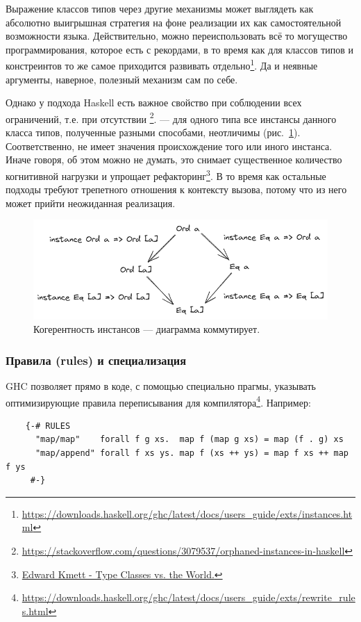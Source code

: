 Выражение классов типов через другие механизмы может выглядеть как абсолютно выигрышная стратегия на фоне реализации их как самостоятельной возможности языка.
Действительно, можно переиспользовать всё то могущество программирования, которое есть с рекордами, в то время как для классов типов и констреинтов то же самое приходится развивать отдельно\footnote{\url{https://downloads.haskell.org/ghc/latest/docs/users_guide/exts/instances.html}}.
Да и неявные аргументы, наверное, полезный механизм сам по себе.

Однако у подхода Haskell есть важное свойство при соблюдении всех ограничений, т.е. при отсутствии \footnote{\url{https://stackoverflow.com/questions/3079537/orphaned-instances-in-haskell}}.
 --- для одного типа все инстансы данного класса типов, полученные разными способами, неотличимы (рис.~\ref{fig:coherence}).
Соответственно, не имеет значения происхождение того или иного инстанса.
Иначе говоря, об этом можно не думать, это снимает существенное количество когнитивной нагрузки и упрощает рефакторинг\footnote{\href{https://youtu.be/hIZxTQP1ifo?si=aG2Lk2eb-5E5SOLb}{Edward Kmett - Type Classes vs. the World.}}.
В то время как остальные подходы требуют трепетного отношения к контексту вызова, потому что из него может прийти неожиданная реализация.

\begin{figure}
    \centering
    \includegraphics[width=0.8\linewidth]{figs/coherence}
    \caption{Когерентность инстансов --- диаграмма коммутирует.}
    \label{fig:coherence}
\end{figure}

\subsubsection{Правила (rules) и специализация}

GHC позволяет прямо в коде, с помощью специально прагмы, указывать оптимизирующие правила переписывания для компилятора\footnote{\url{https://downloads.haskell.org/ghc/latest/docs/users_guide/exts/rewrite_rules.html}}.
Например:
\begin{verbatim}
    {-# RULES
      "map/map"    forall f g xs.  map f (map g xs) = map (f . g) xs
      "map/append" forall f xs ys. map f (xs ++ ys) = map f xs ++ map f ys
     #-}
\end{verbatim}


